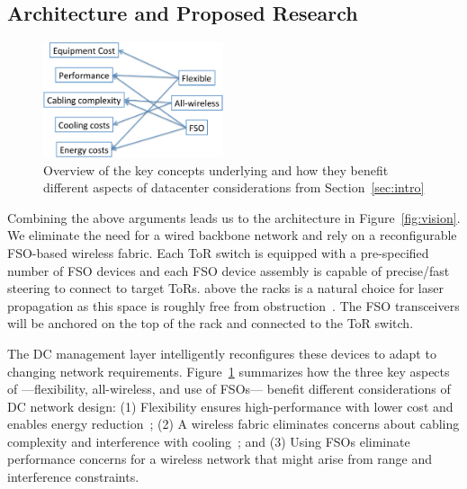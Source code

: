 \subsection{Architecture and Proposed Research}
 
\begin{figure}
\label{fig:benefits}
\vspace{-0.4cm}
\centering
\includegraphics[width=150pt]{PPTFigs/benefitidea.pdf}
\caption{Overview of the key concepts underlying \ArchName and how they benefit different aspects 
 of datacenter considerations from Section~\ref{sec:intro}}
\label{fig:benefits}
\vspace{-0.4cm}
\end{figure}



Combining the above arguments leads us to the architecture   
in Figure~\ref{fig:vision}.  We eliminate the need for a wired backbone network
and rely on a reconfigurable FSO-based wireless fabric.  Each ToR switch is
equipped with a  pre-specified number of FSO devices and  each FSO device
assembly is capable of precise/fast steering to connect to  target
 ToRs. 
 above the racks is a natural choice for laser propagation as this
 space is roughly free from obstruction~\cite{samirpic}.  The FSO
 transceivers will be anchored on the top of the rack and connected to
 the ToR switch.  

 The DC management layer  intelligently
reconfigures these devices  to adapt to  changing network requirements.
 Figure~\ref{fig:benefits} summarizes  how the three key aspects of
\ArchName---flexibility, all-wireless, and use of FSOs--- benefit different
considerations of DC network design: (1) Flexibility  ensures high-performance
with lower cost  and  enables energy reduction~\cite{}; (2) A wireless  fabric
eliminates concerns about cabling complexity and  interference with
cooling~\cite{hpcabling}; and (3) Using FSOs eliminate performance concerns for
a wireless network that might arise from range and  interference constraints. 


